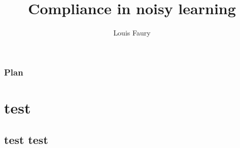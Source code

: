\documentclass[t]{beamer}
\begin{document}
\title[Role of compliance in noisy learning imitation tradeoff]{Compliance in noisy learning}
\author[Test]{Louis Faury}

\titlepage

\begin{frame}[t]
	\vspace{-3ex}
	\frametitle{Plan}
  	\tableofcontents[hideothersubsections]
\end{frame}

\section{test}
\subsection{test test}
\frame[t]
{

}


%
\end{document}
